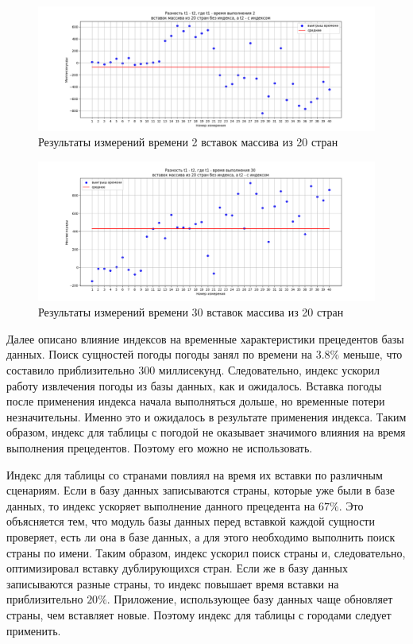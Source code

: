 \begin{figure}[H]
	\centering
	\includegraphics[width=\textwidth]{tools/img/plot3.png}
	\caption{
        Результаты измерений времени 2 вставок массива из 20 стран
    }
	\label{fig:plot3}
\end{figure}

\begin{figure}[H]
	\centering
	\includegraphics[width=\textwidth]{tools/img/plot4.png}
	\caption{
        Результаты измерений времени 30 вставок массива из 20 стран
    }
	\label{fig:plot4}
\end{figure}

Далее описано влияние индексов на временные характеристики прецедентов базы данных.
Поиск сущностей погоды погоды занял по времени на $3.8\%$ меньше, что составило приблизительно 300 миллисекунд.
Следовательно, индекс ускорил работу извлечения погоды из базы данных, как и ожидалось.
Вставка погоды после применения индекса начала выполняться дольше, но временные потери незначительны.
Именно это и ожидалось в результате применения индекса.
Таким образом, индекс для таблицы с погодой не оказывает значимого влияния на время выполнения прецедентов.
Поэтому его можно не использовать.

Индекс для таблицы со странами повлиял на время их вставки по различным сценариям.
Если в базу данных записываются страны, которые уже были в базе данных, то индекс ускоряет выполнение данного прецедента на $67\%$.
Это объясняется тем, что модуль базы данных перед вставкой каждой сущности проверяет, есть ли она в базе данных, а для этого необходимо выполнить поиск страны по имени.
Таким образом, индекс ускорил поиск страны и, следовательно, оптимизировал вставку дублирующихся стран.
Если же в базу данных записываются разные страны, то индекс повышает время вставки на приблизительно $20\%$.
Приложение, использующее базу данных чаще обновляет страны, чем вставляет новые.
Поэтому индекс для таблицы с городами следует применить.

